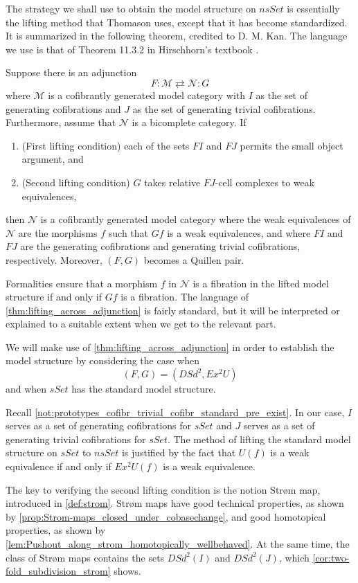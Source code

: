 The strategy we shall use to obtain the model structure on $nsSet$ is essentially the lifting method that Thomason \cite{Th80} uses, except that it has become standardized. It is summarized in the following theorem, credited to D. M. Kan. The language we use is that of Theorem 11.3.2 in Hirschhorn's textbook \cite[p.~214]{Hi03}.
\begin{theorem}[D.M. Kan]\label{thm:lifting_across_adjunction}
Suppose there is an adjunction
\[F:\mathscr{M} \rightleftarrows \mathscr{N} :G\]
where $\mathscr{M}$ is a cofibrantly generated model category with $I$ as the set of generating cofibrations and $J$ as the set of generating trivial cofibrations. Furthermore, assume that $\mathscr{N}$ is a bicomplete category. If
 \begin{enumerate}
  \item {(First lifting condition) each of the sets $FI$ and $FJ$ permits the small object argument, and}
  \item{(Second lifting condition) $G$ takes relative $FJ$-cell complexes to weak equivalences,}
 \end{enumerate}
then $\mathscr{N}$ is a cofibrantly generated model category where the weak equivalences of $\mathscr{N}$ are the morphisms $f$ such that $Gf$ is a weak equivalences, and where $FI$ and $FJ$ are the generating cofibrations and generating trivial cofibrations, respectively. Moreover, $(F,G)$ becomes a Quillen pair.
\end{theorem}
\noindent Formalities ensure that a morphism $f$ in $\mathscr{N}$ is a fibration in the lifted model structure if and only if $Gf$ is a fibration. The language of \cref{thm:lifting_across_adjunction} is fairly standard, but it will be interpreted or explained to a suitable extent when we get to the relevant part.

We will make use of \cref{thm:lifting_across_adjunction} in order to establish the model structure by considering the case when
\[(F,G)=(DSd^2,Ex^2U)\]
and when $sSet$ has the standard model structure.

Recall \cref{not:prototypes_cofibr_trivial_cofibr_standard_pre_exist}. In our case, $I$ serves as a set of generating cofibrations for $sSet$ and $J$ serves as a set of generating trivial cofibrations for $sSet$. The method of lifting the standard model structure on $sSet$ to $nsSet$ is justified by the fact that $U(f)$ is a weak equivalence if and only if $Ex^2U(f)$ is a weak equivalence.

The key to verifying the second lifting condition is the notion Str\o m map, introduced in \cref{def:strom}. Str\o m maps have good technical properties, as shown by \cref{prop:Strom-maps_closed_under_cobasechange}, and good homotopical properties, as shown by \cref{lem:Pushout_along_strom_homotopically_wellbehaved}. At the same time, the class of Str\o m maps contains the sets $DSd^2(I)$ and $DSd^2(J)$, which \cref{cor:two-fold_subdivision_strom} shows.




